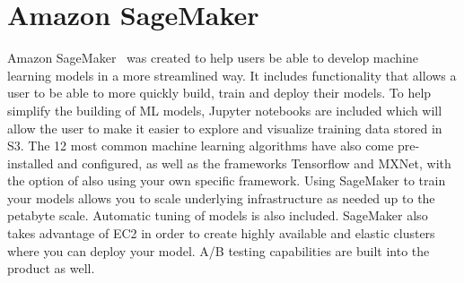 \section{Amazon SageMaker}
Amazon SageMaker~\cite{hid-sp18-521-Sagemaker} was created to help users
be able to develop machine learning models in a more streamlined way. It
includes functionality that allows a user to be able to more quickly build,
train and deploy their models. To help simplify the building of ML models,
Jupyter notebooks are included which will allow the user to make it easier
to explore and visualize training data stored in S3. The 12 most common 
machine learning algorithms have also come pre-installed and configured,
as well as the frameworks Tensorflow and MXNet, with the option of also 
using your own specific framework. Using SageMaker to train your models 
allows you to scale underlying infrastructure as needed up to the petabyte
scale. Automatic tuning of models is also included. SageMaker also takes
advantage of EC2 in order to create highly available and elastic clusters
where you can deploy your model. A/B testing capabilities are built
into the product as well. 
